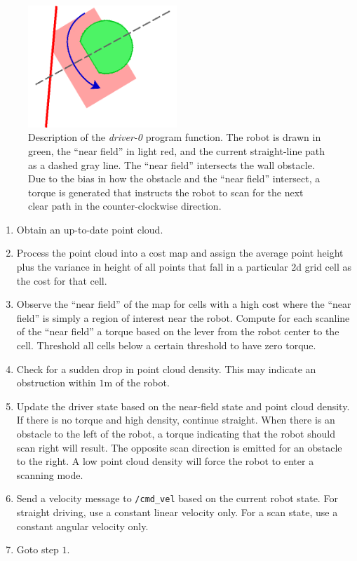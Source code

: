 \documentclass[letterpaper]{article}%
\begin{document}
\begin{figure}
  \centering
  \includegraphics[width=0.5\textwidth]{driver-0.png}
  \caption{Description of the {\em driver-0} program function. The robot is
  drawn in green, the ``near field'' in light red, and the current
  straight-line path as a dashed gray line. The ``near field'' intersects the
  wall obstacle. Due to the bias in how the obstacle and the ``near field''
  intersect, a torque is generated that instructs the robot to scan for the
  next clear path in the counter-clockwise direction.}
  \label{fig:driver-0}
\end{figure}

\begin{enumerate}
  \item Obtain an up-to-date point cloud.
  \item Process the point cloud into a cost map and assign the average point
    height plus the variance in height of all points that fall in a particular
    2d grid cell as the cost for that cell.
  \item Observe the ``near field'' of the map for cells with a high cost where
    the ``near field'' is simply a region of interest near the robot.  Compute
    for each scanline of the ``near field'' a torque based on the lever from
    the robot center to the cell. Threshold all cells below a certain threshold
    to have zero torque.
  \item Check for a sudden drop in point cloud density. This may indicate an
    obstruction within $1$m of the robot.
  \item Update the driver state based on the near-field state and point cloud
    density. If there is no torque and high density, continue straight. When
    there is an obstacle to the left of the robot, a torque indicating that the
    robot should scan right will result. The opposite scan direction is emitted
    for an obstacle to the right. A low point cloud density will force the
    robot to enter a scanning mode.
  \item Send a velocity message to {\tt /cmd\_vel} based on the current robot
    state. For straight driving, use a constant linear velocity only. For a
    scan state, use a constant angular velocity only.
  \item Goto step $1$.
\end{enumerate}
\end{document}
